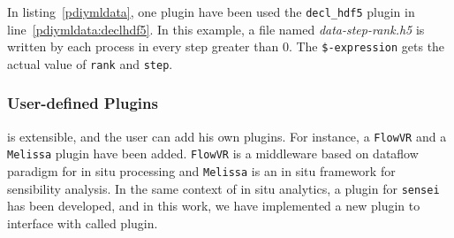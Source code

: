 In listing~\ref{pdiymldata}, one plugin have been used the \texttt{decl\_hdf5} plugin in line~\ref{pdiymldata:declhdf5}. In this example, a file named \textit{data-step-rank.h5} is written by each process in every step greater than 0. The \texttt{\$-expression} gets the actual value of \texttt{rank} and \texttt{step}.    

\subsubsection{User-defined Plugins}
\pdi is extensible, and the user can add his own plugins. For instance, a \texttt{FlowVR} and a \texttt{Melissa} plugin have been added. \texttt{FlowVR}\cite{} is a middleware based on dataflow paradigm for in situ processing and \texttt{Melissa}\cite{} is an in situ framework for sensibility analysis. In the same context of in situ analytics, a plugin for \texttt{sensei} has been developed, and in this work, we have implemented a new plugin to interface with \dask called \deisa plugin.  



